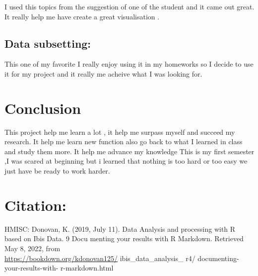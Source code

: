 \documentclass[
]{article}
\begin{document}
I used this topics from the suggestion of one of the student and it came
out great. It really help me have create a great visualisation .

\hypertarget{data-subsetting}{%
\subsection{Data subsetting:}\label{data-subsetting}}

This one of my favorite I really enjoy using it in my homeworks so I
decide to use it for my project and it really me acheive what I was
looking for.

\hypertarget{conclusion}{%
\section{Conclusion}\label{conclusion}}

This project help me learn a lot , it help me surpass myself and succeed
my research. It help me learn new function also go back to what I
learned in class and study them more. It help me advance my knowledge
This is my first semester ,I was scared at beginning but i learned that
nothing is too hard or too easy we just have be ready to work harder.

\hypertarget{citation}{%
\section{Citation:}\label{citation}}

HMISC: Donovan, K. (2019, July 11). Data Analysis and processing with R
based on Ibis Data. 9 Docu­ menting your results with R Markdown.
Retrieved May 8, 2022, from\\
\url{https://bookdown.org/kdonovan125/} ibis\_data\_analysis\_ r4/
documenting-your-results-with- r-markdown.html
\end{document}
